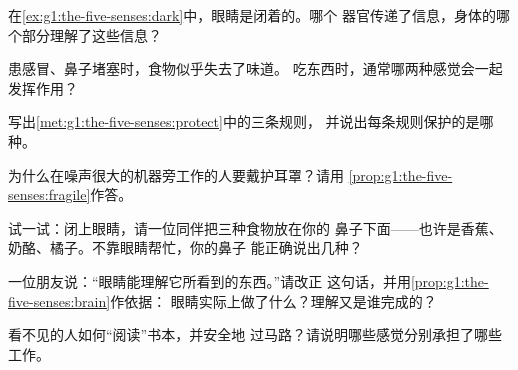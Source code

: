 \begin{exercise}[$\star$]\label{exo:g1:the-five-senses:4}
在\cref{ex:g1:the-five-senses:dark}中，眼睛是闭着的。哪个
器官传递了信息，身体的哪个部分理解了这些信息？
\end{exercise}

\begin{exercise}[$\star$]\label{exo:g1:the-five-senses:5}
患感冒、鼻子堵塞时，食物似乎失去了味道。
吃东西时，通常哪两种感觉会一起发挥作用？
\end{exercise}

\begin{exercise}[$\star$]\label{exo:g1:the-five-senses:6}
写出\cref{met:g1:the-five-senses:protect}中的三条规则，
并说出每条规则保护的是哪种。
\end{exercise}

\begin{exercise}[$\star$]\label{exo:g1:the-five-senses:7}
为什么在噪声很大的机器旁工作的人要戴护耳罩？请用
\cref{prop:g1:the-five-senses:fragile}作答。
\end{exercise}

\begin{exercise}[$\star$]\label{exo:g1:the-five-senses:8}
试一试：闭上眼睛，请一位同伴把三种食物放在你的
鼻子下面——也许是香蕉、奶酪、橘子。不靠眼睛帮忙，你的鼻子
能正确说出几种？
\end{exercise}

\begin{exercise}[$\star\star$]\label{exo:g1:the-five-senses:9}
一位朋友说：“眼睛能理解它所看到的东西。”请改正
这句话，并用\cref{prop:g1:the-five-senses:brain}作依据：
眼睛实际上做了什么？理解又是谁完成的？
\end{exercise}

\begin{exercise}[$\star\star$]\label{exo:g1:the-five-senses:10}
看不见的人如何“阅读”书本，并安全地
过马路？请说明哪些感觉分别承担了哪些工作。
\end{exercise}
